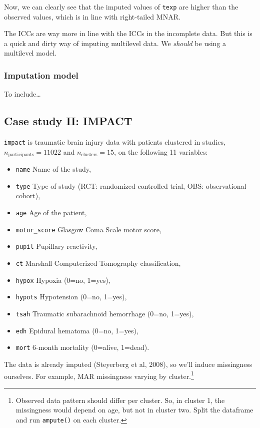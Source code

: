 \documentclass[
]{jss}
\providecommand{\tightlist}{%
  \setlength{\itemsep}{0pt}\setlength{\parskip}{0pt}}
\begin{document}
Now, we can clearly see that the imputed values of \texttt{texp} are
higher than the observed values, which is in line with right-tailed
MNAR.

The ICCs are way more in line with the ICCs in the incomplete data. But
this is a quick and dirty way of imputing multilevel data. We
\emph{should} be using a multilevel model.

\hypertarget{imputation-model-2}{%
\subsubsection{Imputation model}\label{imputation-model-2}}

To include\ldots{}

\hypertarget{case-study-ii-impact}{%
\subsection{Case study II: IMPACT}\label{case-study-ii-impact}}

\texttt{impact} is traumatic brain injury data with patients clustered
in studies, \(n_{\text{participants}} = 11022\) and
\(n_{\text{clusters}} = 15\), on the following 11 variables:

\begin{itemize}
\tightlist
\item
  \texttt{name} Name of the study,
\item
  \texttt{type} Type of study (RCT: randomized controlled trial, OBS:
  observational cohort),
\item
  \texttt{age} Age of the patient,
\item
  \texttt{motor\_score} Glasgow Coma Scale motor score,
\item
  \texttt{pupil} Pupillary reactivity,
\item
  \texttt{ct} Marshall Computerized Tomography classification,
\item
  \texttt{hypox} Hypoxia (0=no, 1=yes),
\item
  \texttt{hypots} Hypotension (0=no, 1=yes),
\item
  \texttt{tsah} Traumatic subarachnoid hemorrhage (0=no, 1=yes),
\item
  \texttt{edh} Epidural hematoma (0=no, 1=yes),
\item
  \texttt{mort} 6-month mortality (0=alive, 1=dead).
\end{itemize}

The data is already imputed (Steyerberg et al, 2008), so we'll induce
missingness ourselves. For example, MAR missingness varying by
cluster.\footnote{Observed data pattern should differ per cluster. So,
  in cluster 1, the missingness would depend on age, but not in cluster
  two. Split the dataframe and run \texttt{ampute()} on each cluster.}
\end{document}
